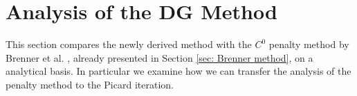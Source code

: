 
\section{Analysis of the DG Method} \label{sec: DG analysis}
This section compares the newly derived method with the $C^0$ penalty method by Brenner et al. \cite{BGN+2011}, already presented in Section \ref{sec: Brenner method}, on a analytical basis. In particular we examine how we can transfer the analysis of the penalty method to the Picard iteration.

